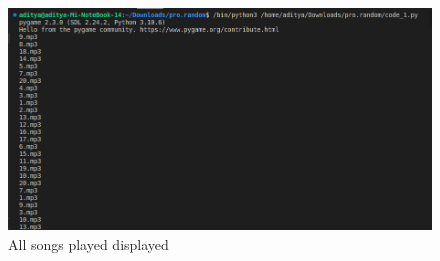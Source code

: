 \documentclass[journal,12pt,twocolumn]{IEEEtran}
\begin{document}
    \begin{figure}[h]
        \includegraphics[scale=0.5]{figs/img3.png}
        \caption{All songs played displayed}
        \label{output3}
    \end{figure}
    
\end{document}

